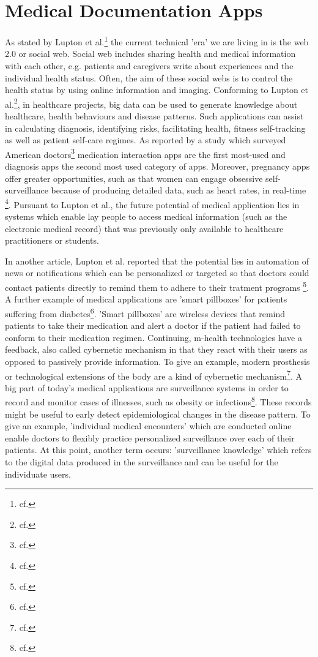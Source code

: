 \section{Medical Documentation Apps}

As stated by Lupton et al.\footnote{cf.\autocite{lupton_apps}} the current technical 'era' we are living in is the web 2.0 or social web. Social web includes sharing health and medical information with each other, e.g. patients and caregivers write about experiences and the individual health status. Often, the aim of these social webs is to control the health status by using online information and imaging.
Conforming to Lupton et al.\footnote{cf.\autocite{lupton_apps}}, in healthcare projects, big data can be used to generate knowledge about healthcare, health behaviours and disease patterns. Such applications can assist in calculating diagnosis, identifying risks, facilitating health, fitness self-tracking as well as patient self-care regimes.
As reported by a study which surveyed American doctors\footnote{cf.\autocite{lupton_apps}} medication interaction apps are the first most-used and diagnosis apps the second most used category of apps.
Moreover, pregnancy apps offer greater opportunities, such as that women can engage obsessive self-surveillance because of producing detailed data, such as heart rates, in real-time \footnote{cf.\autocite{lupton_apps}}. Pursuant to Lupton et al., the future potential of medical application lies in systems which enable lay people to access medical information (such as the electronic medical record) that was previously only available to healthcare practitioners or students.

In another article, Lupton et al. reported that the potential lies in automation of news or notifications which can be personalized or targeted so that doctors could contact patients directly to remind them to adhere to their tratment programs \footnote{cf.\autocite{lupton_mhealth}}.
A further example of medical applications are 'smart pillboxes' for patients suffering from diabetes\footnote{cf.\autocite{lupton_mhealth}}. 'Smart pillboxes' are wireless devices that remind patients to take their medication and alert a doctor if the patient had failed to conform to their medication regimen.
Continuing, \ac{m-health} technologies have a feedback, also called cybernetic mechanism in that they react with their users as opposed to passively provide information. To give an example, modern prosthesis or technological extensions of the body are a kind of cybernetic mechanism\footnote{cf.\autocite{lupton_mhealth}}. 
A big part of today's medical applications are surveillance systems in order to record and monitor cases of illnesses, such as obesity or infections\footnote{cf.\autocite{lupton_mhealth}}. These records might be useful to early detect epidemiological changes in the disease pattern. To give an example, 'individual medical encounters' which are conducted online enable doctors to flexibly practice personalized surveillance over each of their patients. At this point, another term occurs: 'surveillance knowledge' which refers to the digital data produced in the surveillance and can be useful for the individuate users.

